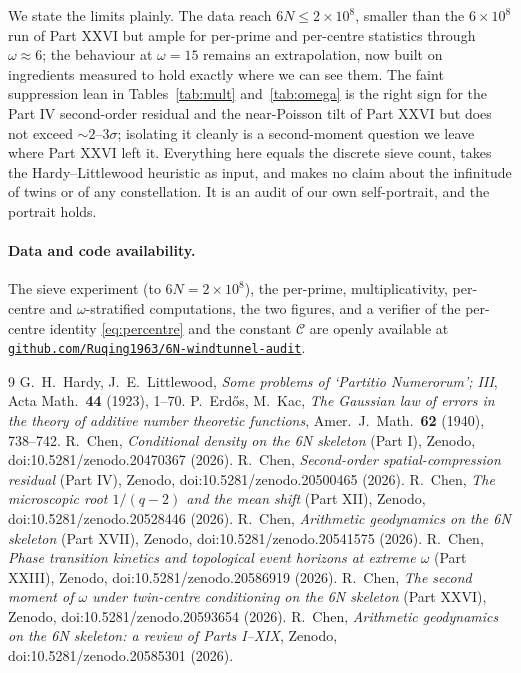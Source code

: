 \documentclass[11pt]{article}
\theoremstyle{definition}
\begin{document}
We state the limits plainly. The data reach $6N\le2\times10^{8}$, smaller than the $6\times10^{8}$ run of
Part XXVI \cite{PXXVI} but ample for per-prime and per-centre statistics through $\omega\approx6$; the
behaviour at $\omega=15$ remains an extrapolation, now built on ingredients measured to hold exactly where we
can see them. The faint suppression lean in Tables~\ref{tab:mult} and~\ref{tab:omega} is the right sign for
the Part IV second-order residual and the near-Poisson tilt of Part XXVI but does not exceed $\sim\!2\text{--}3\sigma$;
isolating it cleanly is a second-moment question we leave where Part XXVI left it. Everything here equals the
discrete sieve count, takes the Hardy--Littlewood heuristic as input, and makes no claim about the infinitude
of twins or of any constellation. It is an audit of our own self-portrait, and the portrait holds.

\paragraph{Data and code availability.} The sieve experiment (to $6N=2\times10^{8}$), the per-prime,
multiplicativity, per-centre and $\omega$-stratified computations, the two figures, and a verifier of the
per-centre identity \eqref{eq:percentre} and the constant $\mathcal{C}$ are openly available at
\href{https://github.com/Ruqing1963/6N-windtunnel-audit}{\texttt{github.com/Ruqing1963/6N-windtunnel-audit}}.

\begin{thebibliography}{9}
 G.~H.~Hardy, J.~E.~Littlewood, \emph{Some problems of `Partitio Numerorum'; III}, Acta Math.\ \textbf{44} (1923), 1--70.
 P.~Erd\H{o}s, M.~Kac, \emph{The Gaussian law of errors in the theory of additive number theoretic functions}, Amer.\ J.\ Math.\ \textbf{62} (1940), 738--742.
 R.~Chen, \emph{Conditional density on the 6N skeleton} (Part I), Zenodo, doi:10.5281/zenodo.20470367 (2026).
 R.~Chen, \emph{Second-order spatial-compression residual} (Part IV), Zenodo, doi:10.5281/zenodo.20500465 (2026).
 R.~Chen, \emph{The microscopic root $1/(q-2)$ and the mean shift} (Part XII), Zenodo, doi:10.5281/zenodo.20528446 (2026).
 R.~Chen, \emph{Arithmetic geodynamics on the 6N skeleton} (Part XVII), Zenodo, doi:10.5281/zenodo.20541575 (2026).
 R.~Chen, \emph{Phase transition kinetics and topological event horizons at extreme $\omega$} (Part XXIII), Zenodo, doi:10.5281/zenodo.20586919 (2026).
 R.~Chen, \emph{The second moment of $\omega$ under twin-centre conditioning on the 6N skeleton} (Part XXVI), Zenodo, doi:10.5281/zenodo.20593654 (2026).
 R.~Chen, \emph{Arithmetic geodynamics on the 6N skeleton: a review of Parts I--XIX}, Zenodo, doi:10.5281/zenodo.20585301 (2026).
\end{thebibliography}
\end{document}
